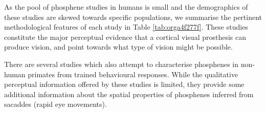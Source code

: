 \documentclass[a4paper,11pt,openany]{book}
\begin{document}
As the pool of phosphene studies in humans is small and the demographics of these studies are skewed towards specific populations, we summarise the pertinent methodological features of each study in Table \ref{tab:orga4f277f}.
These studies constitute the major perceptual evidence that a cortical visual prosthesis can produce vision, and point towards what type of vision might be possible.

There are several studies which also attempt to characterise phosphenes in non-human primates from trained behavioural responses. \cite{tehovnik_phosphene_2005,tehovnik_phosphene_2007,tehovnik_microstimulation_2007,tehovnik_microstimulation_2009}
While the qualitative perceptual information offered by these studies is limited, they provide some additional information about the spatial properties of phosphenes inferred from sacaddes (rapid eye movements).
\end{document}
